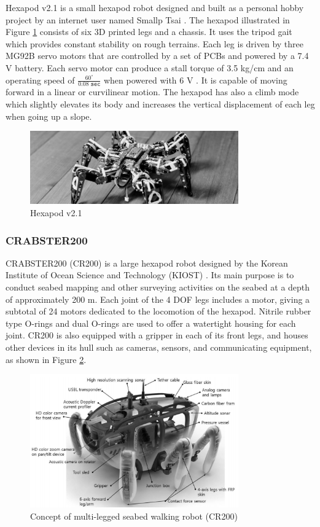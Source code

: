 Hexapod v2.1 is a small hexapod robot designed and built as a personal hobby project by an internet user named Smallp Tsai \cite{smallp_tsai_hexapod_2018}. The hexapod illustrated in Figure \ref{fig:hexapodv2p1_img} consists of six 3D printed legs and a chassis. It uses the tripod gait which provides constant stability on rough terrains. Each leg is driven by three MG92B servo motors that are controlled by a set of PCBs and powered by a 7.4 V battery. Each servo motor can produce a stall torque of 3.5 kg/cm and an operating speed of $\frac{60^{\circ}}{0.08\texttt{ sec}}$ when powered with 6 V \cite{tower_pro_mg92b_nodate}. It is capable of moving forward in a linear or curvilinear motion. The hexapod has also a climb mode which slightly elevates its body and increases the vertical displacement of each leg when going up a slope.

\begin{figure}[H]
    \centering
    \includegraphics[width=0.8\textwidth]{Sections/LiteratureReview/img/hexapodV2.1/hexapod_v2p1.jpg}
    \caption{Hexapod v2.1 \cite{smallp_tsai_hexapod_2018}}
    \label{fig:hexapodv2p1_img}
\end{figure}

\subsubsection{CRABSTER200}

CRABSTER200 (CR200) is a large hexapod robot designed by the Korean Institute of Ocean Science and Technology (KIOST) \cite{shim_development_2016}. Its main purpose is to conduct seabed mapping and other surveying activities on the seabed at a depth of approximately 200 m. Each joint of the 4 DOF legs includes a motor, giving a subtotal of 24 motors dedicated to the locomotion of the hexapod. Nitrile rubber type O-rings and dual O-rings are used to offer a watertight housing for each joint. CR200 is also equipped with a gripper in each of its front legs, and houses other devices in its hull such as cameras, sensors, and communicating equipment, as shown in Figure \ref{fig:crabsterdetailed_img}.

\begin{figure}[H]
    \centering
    \includegraphics[width=0.8\textwidth]{Sections/LiteratureReview/img/Crabster/crabster_detailed.jpg}
    \caption{Concept of multi-legged seabed walking robot (CR200) \cite{shim_development_2016}}
    \label{fig:crabsterdetailed_img}
\end{figure}